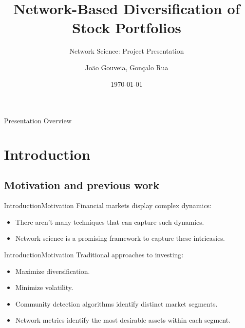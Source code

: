 \documentclass[bigger]{beamer}
\title{Network-Based Diversification of Stock Portfolios}
\subtitle{Network Science: Project Presentation}
\author{João Gouveia, Gonçalo Rua}
\institute{Instituto Superior Técnico}
\date{\today}
\begin{document}

\begin{frame}
    \titlepage
\end{frame}


\begin{frame}{Presentation Overview}
    \tableofcontents
\end{frame}


\section{Introduction}

\subsection{Motivation and previous work}

\begin{frame}{Introduction}{Motivation}
    Financial markets display complex dynamics:
    \begin{itemize}
        \item<2-> There aren't many techniques that can capture such dynamics.
        \item<3-> Network science is a promising framework to capture these intricasies.
    \end{itemize}
\end{frame}

\begin{frame}{Introduction}{Motivation}
    Traditional approaches to investing:
    \begin{itemize}
        \item<2-> Maximize diversification.
        \item<3-> Minimize volatility.
    \end{itemize}
    \bigskip
    \begin{itemize}
        \item<5-> Community detection algorithms identify distinct market segments.
        \item<6-> Network metrics identify the most desirable assets within each segment.
    \end{itemize}
\end{frame}
\end{document}
